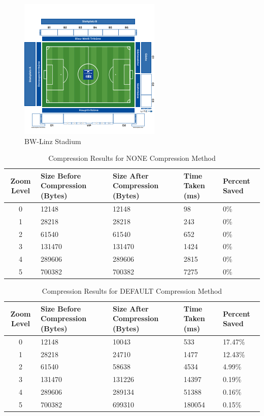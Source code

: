 \begin{figure}[H]
    \centering
    \includegraphics[scale=0.8]{pics/test_stadium.png}
    \caption{BW-Linz Stadium}
    \label{fig:impl:bw-stadium}
\end{figure}

\begin{table}[H]
    \centering
    \begin{tabularx}{\textwidth}{|c|X|X|X|X|}
        \hline
        \textbf{Zoom Level} & \textbf{Size Before Compression (Bytes)} & \textbf{Size After Compression (Bytes)} & \textbf{Time Taken (ms)} & \textbf{Percent Saved} \\ \hline
        0 & 12148 & 12148 & 98 & 0\% \\ \hline
        1 & 28218 & 28218 & 243 & 0\% \\ \hline
        2 & 61540 & 61540 & 652 & 0\% \\ \hline
        3 & 131470 & 131470 & 1424 & 0\% \\ \hline
        4 & 289606 & 289606 & 2815 & 0\% \\ \hline
        5 & 700382 & 700382 & 7275 & 0\% \\ \hline
    \end{tabularx}
    \caption{Compression Results for NONE Compression Method}
    \label{tab:compression_none}
\end{table}

\begin{table}[H]
    \centering
    \begin{tabularx}{\textwidth}{|c|X|X|X|X|}
        \hline
        \textbf{Zoom Level} & \textbf{Size Before Compression (Bytes)} & \textbf{Size After Compression (Bytes)} & \textbf{Time Taken (ms)} & \textbf{Percent Saved} \\ \hline
        0 & 12148 & 10043 & 533 & 17.47\% \\ \hline
        1 & 28218 & 24710 & 1477 & 12.43\% \\ \hline
        2 & 61540 & 58638 & 4534 & 4.99\% \\ \hline
        3 & 131470 & 131226 & 14397 & 0.19\% \\ \hline
        4 & 289606 & 289134 & 51388 & 0.16\% \\ \hline
        5 & 700382 & 699310 & 180054 & 0.15\% \\ \hline
    \end{tabularx}
    \caption{Compression Results for DEFAULT Compression Method}
    \label{tab:compression_default}
\end{table}

